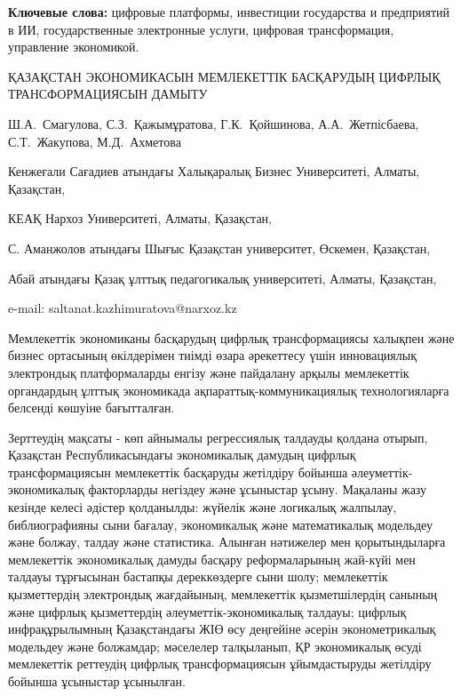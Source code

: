 {\bfseries Ключевые слова:} цифровые платформы, инвестиции государства и
предприятий в ИИ, государственные электронные услуги, цифровая
трансформация, управление экономикой.

\begin{header}
ҚАЗАҚСТАН ЭКОНОМИКАСЫН МЕМЛЕКЕТТІК БАСҚАРУДЫҢ ЦИФРЛЫҚ ТРАНСФОРМАЦИЯСЫН ДАМЫТУ

Ш.А.~Смагулова,
С.З.~Қажымұратова\envelope,
Г.К.~Қойшинова,
А.А.~Жетпісбаева,
С.Т.~Жакупова,
М.Д.~Ахметова
\end{header}

\begin{affil}
Кенжеғали Сағадиев атындағы Халықаралық Бизнес Университеті, Алматы, Қазақстан,

КЕАҚ Нархоз Университеті, Алматы, Қазақстан,

С. Аманжолов атындағы Шығыс Қазақстан университет, Өскемен, Қазақстан,

Абай атындағы Қазақ ұлттық педагогикалық университеті, Алматы, Қазақстан,

e-mail: saltanat.kazhimuratova@narxoz.kz
\end{affil}

Мемлекеттік экономиканы басқарудың цифрлық трансформациясы халықпен және
бизнес ортасының өкілдерімен тиімді өзара әрекеттесу үшін инновациялық
электрондық платформаларды енгізу және пайдалану арқылы мемлекеттік
органдардың ұлттық экономикада ақпараттық-коммуни\-кациялық
технологияларға белсенді көшуіне бағытталған.

Зерттеудің мақсаты - көп айнымалы регрессиялық талдауды қолдана отырып,
Қазақстан Республикасындағы экономикалық дамудың цифрлық
трансформациясын мемлекеттік басқаруды жетілдіру бойынша
әлеуметтік-экономикалық факторларды негіздеу және ұсыныстар ұсыну.
Мақаланы жазу кезінде келесі әдістер қолданылды: жүйелік және логикалық
жалпылау, библиографияны сыни бағалау, экономикалық және математикалық
модельдеу және болжау, талдау және статистика. Алынған нәтижелер мен
қорытындыларға мемлекеттік экономикалық дамуды басқару реформаларының
жай-күйі мен талдауы тұрғысынан бастапқы дереккөздерге сыни шолу;
мемлекеттік қызметтердің электрондық жағдайының, мемлекеттік
қызметшілердің санының және цифрлық қызметтердің әлеуметтік-экономикалық
талдауы; цифрлық инфрақұрылымның Қазақстандағы ЖІӨ өсу деңгейіне әсерін
эконометрикалық модельдеу және болжамдар; мәселелер талқыланып, ҚР
экономикалық өсуді мемлекеттік реттеудің цифрлық трансформациясын
ұйымдастыруды жетілдіру бойынша ұсыныстар ұсынылған.

